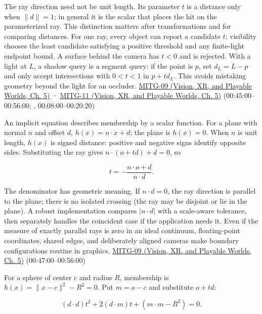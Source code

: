The ray direction need not be unit length. Its parameter \(t\) is a distance only when \(\|d\|=1\); in general it is the scalar that places the hit on the parameterized ray. This distinction matters after transformations and for comparing distances. For one ray, every object can report a candidate \(t\); visibility chooses the least candidate satisfying a positive threshold and any finite-light endpoint bound. A surface behind the camera has \(t<0\) and is rejected. With a light at \(L\), a shadow query is a segment query: if the point is \(p\), set \(d_L=L-p\) and only accept intersections with \(0<t<1\) in \(p+td_L\). This avoids mistaking geometry beyond the light for an occluder. \href{../07-Vision-XR-and-Playable-Worlds/main.pdf\#nameddest=04-visual-computing-ii-ch036-mitg-09---ray-casting}{MITG-09 (Vision, XR, and Playable Worlds, Ch. 5)} · \href{../07-Vision-XR-and-Playable-Worlds/main.pdf\#nameddest=04-visual-computing-ii-ch036-mitg-11---ray-tracing}{MITG-11 (Vision, XR, and Playable Worlds, Ch. 5)} (00:45:00--00:56:00; , 00:08:00--00:20:20)

An implicit equation describes membership by a scalar function. For a plane with normal \(n\) and offset \(d\), \(h(x)=n\cdot x+d\); the plane is \(h(x)=0\). When \(n\) is unit length, \(h(x)\) is signed distance: positive and negative signs identify opposite sides. Substituting the ray gives \(n\cdot(o+td)+d=0\), so

\[
t=-\frac{n\cdot o+d}{n\cdot d}.
\]

The denominator has geometric meaning. If \(n\cdot d=0\), the ray direction is parallel to the plane; there is no isolated crossing (the ray may be disjoint or lie in the plane). A robust implementation compares \(|n\cdot d|\) with a scale-aware tolerance, then separately handles the coincident case if the application needs it. Even if the measure of exactly parallel rays is zero in an ideal continuum, floating-point coordinates, shared edges, and deliberately aligned cameras make boundary configurations routine in graphics. \href{../07-Vision-XR-and-Playable-Worlds/main.pdf\#nameddest=04-visual-computing-ii-ch036-mitg-09---ray-casting}{MITG-09 (Vision, XR, and Playable Worlds, Ch. 5)} (00:47:00--00:56:00)

For a sphere of center \(c\) and radius \(R\), membership is \(h(x)=\|x-c\|^2-R^2=0\). Put \(m=o-c\) and substitute \(o+td\):

\[
(d\cdot d)t^2+2(d\cdot m)t+(m\cdot m-R^2)=0.
\]

